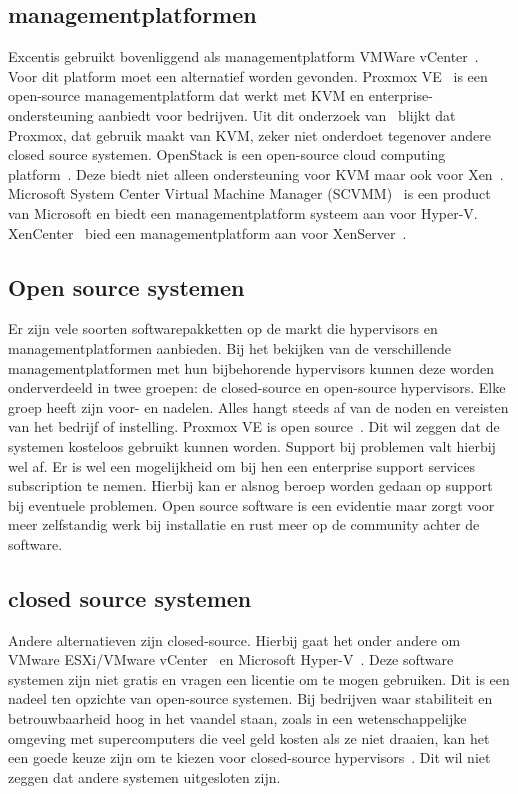\subsection{managementplatformen}
Excentis gebruikt bovenliggend als managementplatform VMWare vCenter~\autocite{vmware}. Voor dit platform moet een alternatief worden gevonden.
Proxmox VE~\autocite{Proxmox} is een open-source managementplatform dat werkt met KVM en enterprise-ondersteuning aanbiedt voor bedrijven. Uit dit onderzoek van~\autocite{ally2018comparative} blijkt dat Proxmox, dat gebruik maakt van KVM, zeker niet onderdoet tegenover andere closed source systemen.
OpenStack is een open-source cloud computing platform~\autocite{openstack2024}. Deze biedt niet alleen ondersteuning voor KVM maar ook voor Xen~\autocite{oleksiuk2023comparative}.
Microsoft System Center Virtual Machine Manager (SCVMM)~\autocite{microsoftvmm2025} is een product van Microsoft en biedt een managementplatform systeem aan voor Hyper-V.
XenCenter~\autocite{xencenter2024} bied een managementplatform aan voor XenServer~\autocite{xencenter2024}.

\subsection{Open source systemen}
Er zijn vele soorten softwarepakketten op de markt die hypervisors en managementplatformen aanbieden. Bij het bekijken van de verschillende managementplatformen met hun bijbehorende hypervisors kunnen deze worden onderverdeeld in twee groepen: de closed-source en open-source hypervisors. Elke groep heeft zijn voor- en nadelen. Alles hangt steeds af van de noden en vereisten van het bedrijf of instelling.
Proxmox VE is open source~\autocite{Proxmox}. Dit wil zeggen dat de systemen kosteloos gebruikt kunnen worden. Support bij problemen valt hierbij wel af. Er is wel een mogelijkheid om bij hen een enterprise support services subscription te nemen. Hierbij kan er alsnog beroep worden gedaan op support bij eventuele problemen.
Open source software is een evidentie maar zorgt voor meer zelfstandig werk bij installatie en rust meer op de community achter de software.

\subsection{closed source systemen}
Andere alternatieven zijn closed-source. Hierbij gaat het onder andere om VMware ESXi/VMware vCenter~\autocite{vmware} en Microsoft Hyper-V~\autocite{Eaton2019}. Deze software systemen zijn niet gratis en vragen een licentie om te mogen gebruiken. Dit is een nadeel ten opzichte van open-source systemen.
Bij bedrijven waar stabiliteit en betrouwbaarheid hoog in het vaandel staan, zoals in een wetenschappelijke omgeving met supercomputers die veel geld kosten als ze niet draaien, kan het een goede keuze zijn om te kiezen voor closed-source hypervisors~\autocite{voras2012early}. Dit wil niet zeggen dat andere systemen uitgesloten zijn.
